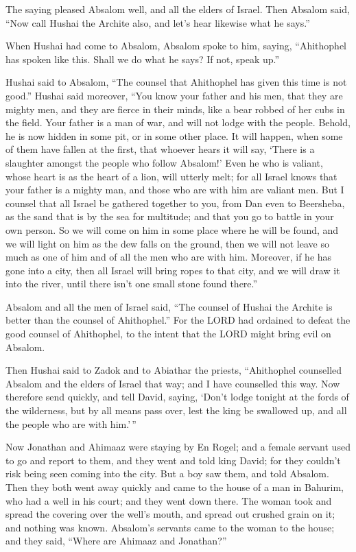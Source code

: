  The saying pleased Absalom well, and all the elders of
Israel.  Then Absalom said, ``Now call Hushai the Archite
also, and let's hear likewise what he says.''

 When Hushai had come to Absalom, Absalom spoke to him,
saying, ``Ahithophel has spoken like this. Shall we do what he says? If
not, speak up.''

 Hushai said to Absalom, ``The counsel that Ahithophel has
given this time is not good.''  Hushai said moreover, ``You
know your father and his men, that they are mighty men, and they are
fierce in their minds, like a bear robbed of her cubs in the field. Your
father is a man of war, and will not lodge with the people. 
Behold, he is now hidden in some pit, or in some other place. It will
happen, when some of them have fallen at the first, that whoever hears
it will say, `There is a slaughter amongst the people who follow
Absalom!'  Even he who is valiant, whose heart is as the
heart of a lion, will utterly melt; for all Israel knows that your
father is a mighty man, and those who are with him are valiant men.
 But I counsel that all Israel be gathered together to you,
from Dan even to Beersheba, as the sand that is by the sea for
multitude; and that you go to battle in your own person. 
So we will come on him in some place where he will be found, and we will
light on him as the dew falls on the ground, then we will not leave so
much as one of him and of all the men who are with him. 
Moreover, if he has gone into a city, then all Israel will bring ropes
to that city, and we will draw it into the river, until there isn't one
small stone found there.''

 Absalom and all the men of Israel said, ``The counsel of
Hushai the Archite is better than the counsel of Ahithophel.'' For the
LORD had ordained to defeat the good counsel of Ahithophel, to the
intent that the LORD might bring evil on Absalom.

 Then Hushai said to Zadok and to Abiathar the priests,
``Ahithophel counselled Absalom and the elders of Israel that way; and I
have counselled this way.  Now therefore send quickly, and
tell David, saying, `Don't lodge tonight at the fords of the wilderness,
but by all means pass over, lest the king be swallowed up, and all the
people who are with him.'\,''

 Now Jonathan and Ahimaaz were staying by En Rogel; and a
female servant used to go and report to them, and they went and told
king David; for they couldn't risk being seen coming into the city.
 But a boy saw them, and told Absalom. Then they both went
away quickly and came to the house of a man in Bahurim, who had a well
in his court; and they went down there.  The woman took and
spread the covering over the well's mouth, and spread out crushed grain
on it; and nothing was known.  Absalom's servants came to
the woman to the house; and they said, ``Where are Ahimaaz and
Jonathan?''

